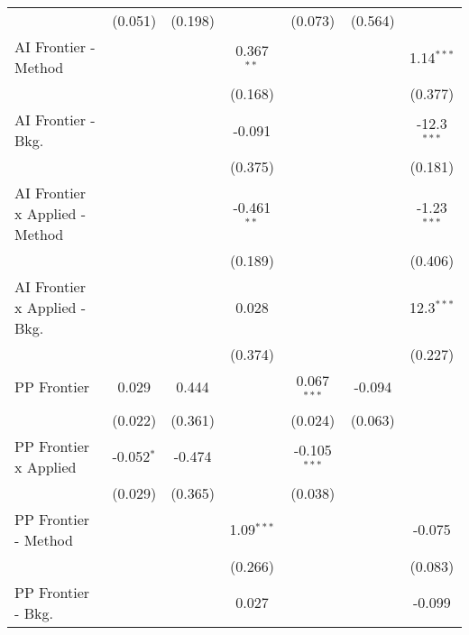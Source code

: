 \begin{tabular}{lcccccc}
                                  & (0.051)        & (0.198)       &               & (0.073)        & (0.564)      &   \\   
   AI Frontier - Method           &                &               & 0.367$^{**}$  &                &              & 1.14$^{***}$\\   
                                  &                &               & (0.168)       &                &              & (0.377)\\   
   AI Frontier - Bkg.             &                &               & -0.091        &                &              & -12.3$^{***}$\\   
                                  &                &               & (0.375)       &                &              & (0.181)\\   
   AI Frontier x Applied - Method &                &               & -0.461$^{**}$ &                &              & -1.23$^{***}$\\   
                                  &                &               & (0.189)       &                &              & (0.406)\\   
   AI Frontier x Applied - Bkg.   &                &               & 0.028         &                &              & 12.3$^{***}$\\   
                                  &                &               & (0.374)       &                &              & (0.227)\\   
   PP Frontier                    & 0.029          & 0.444         &               & 0.067$^{***}$  & -0.094       &   \\   
                                  & (0.022)        & (0.361)       &               & (0.024)        & (0.063)      &   \\   
   PP Frontier x Applied          & -0.052$^{*}$   & -0.474        &               & -0.105$^{***}$ &              &   \\   
                                  & (0.029)        & (0.365)       &               & (0.038)        &              &   \\   
   PP Frontier - Method           &                &               & 1.09$^{***}$  &                &              & -0.075\\   
                                  &                &               & (0.266)       &                &              & (0.083)\\   
   PP Frontier - Bkg.             &                &               & 0.027         &                &              & -0.099\\   

\end{tabular}
